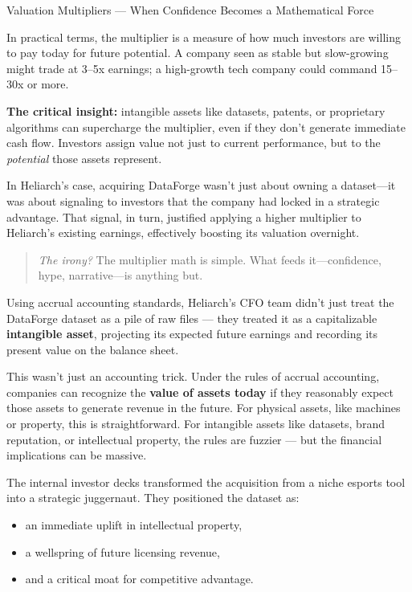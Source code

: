 \begin{HistoricalSidebar}{Valuation Multipliers --- When Confidence Becomes a Mathematical Force}
    \medskip
    
    In practical terms, the multiplier is a measure of how much investors are willing to pay today for future potential.  
    A company seen as stable but slow-growing might trade at 3--5x earnings; a high-growth tech company could command 15--30x or more.
    
    \medskip
    
    \textbf{The critical insight:} intangible assets like datasets, patents, or proprietary algorithms can supercharge the multiplier, even if they don’t generate immediate cash flow. Investors assign value not just to current performance, but to the \textit{potential} those assets represent.
    
    \medskip
    
    In Heliarch’s case, acquiring DataForge wasn’t just about owning a dataset—it was about signaling to investors that the company had locked in a strategic advantage.  
    That signal, in turn, justified applying a higher multiplier to Heliarch’s existing earnings, effectively boosting its valuation overnight.
    
    \begin{quote}
    \textit{The irony?}  
    The multiplier math is simple.  
    What feeds it—confidence, hype, narrative—is anything but.
    \end{quote}
    
\end{HistoricalSidebar}

\medskip

Using accrual accounting standards, Heliarch’s CFO team didn’t just treat the DataForge dataset as a pile of raw files — they treated it as a capitalizable \textbf{intangible asset}, projecting its expected future earnings and recording its present value on the balance sheet.

This wasn’t just an accounting trick. Under the rules of accrual accounting, companies can recognize the \textbf{value of assets today} if they reasonably expect those assets to generate revenue in the future. For physical assets, like machines or property, this is straightforward. For intangible assets like datasets, brand reputation, or intellectual property, the rules are fuzzier — but the financial implications can be massive.

The internal investor decks transformed the acquisition from a niche esports tool into a strategic juggernaut. They positioned the dataset as:
\begin{itemize}
    \item an immediate uplift in intellectual property,
    \item a wellspring of future licensing revenue,
    \item and a critical moat for competitive advantage.
\end{itemize}

